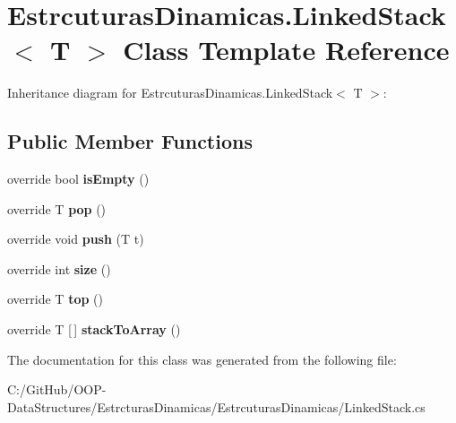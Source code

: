 \hypertarget{class_estrcuturas_dinamicas_1_1_linked_stack}{}\section{Estrcuturas\+Dinamicas.\+Linked\+Stack$<$ T $>$ Class Template Reference}
\label{class_estrcuturas_dinamicas_1_1_linked_stack}


Inheritance diagram for Estrcuturas\+Dinamicas.\+Linked\+Stack$<$ T $>$\+:
\subsection*{Public Member Functions}
\begin{DoxyCompactItemize}
\item 
\mbox{\label{class_estrcuturas_dinamicas_1_1_linked_stack_ab5e7aad3aba7b3c636229a829db0ab3d}} 
override bool {\bfseries is\+Empty} ()
\item 
\mbox{\label{class_estrcuturas_dinamicas_1_1_linked_stack_a31f89101ca34e108353c7a441962bd6d}} 
override T {\bfseries pop} ()
\item 
\mbox{\label{class_estrcuturas_dinamicas_1_1_linked_stack_a6ef00674f27cdf89cfbd2f2d650091fb}} 
override void {\bfseries push} (T t)
\item 
\mbox{\label{class_estrcuturas_dinamicas_1_1_linked_stack_a1d2c654942a679734bbca0613a5eb6c7}} 
override int {\bfseries size} ()
\item 
\mbox{\label{class_estrcuturas_dinamicas_1_1_linked_stack_ac909391f7b034df46119bef559acb2be}} 
override T {\bfseries top} ()
\item 
\mbox{\label{class_estrcuturas_dinamicas_1_1_linked_stack_a3fbfa4330d096f29bc1e526e518fc65e}} 
override T \mbox{[}$\,$\mbox{]} {\bfseries stack\+To\+Array} ()
\end{DoxyCompactItemize}


The documentation for this class was generated from the following file\+:\begin{DoxyCompactItemize}
\item 
C\+:/\+Git\+Hub/\+O\+O\+P-\/\+Data\+Structures/\+Estrcturas\+Dinamicas/\+Estrcuturas\+Dinamicas/Linked\+Stack.\+cs\end{DoxyCompactItemize}
